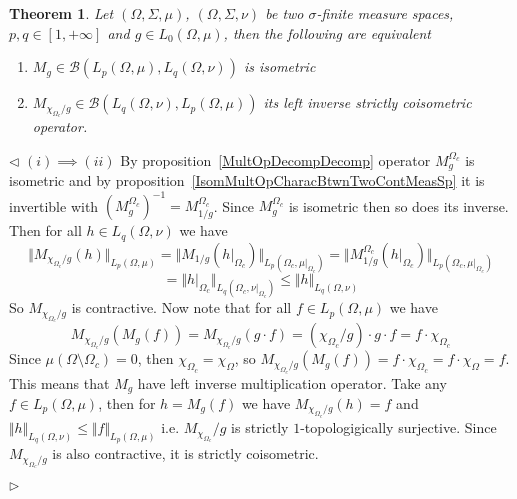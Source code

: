 \documentclass[12pt]{article}
\newtheorem{theorem}{Theorem}[subsection]
\newenvironment{proof}{\par $\triangleleft$}{$\triangleright$}
\begin{document}
\begin{theorem}\label{IsomMultOpDescBtwnTwoMeasSp}
    Let $(\Omega,\Sigma,\mu)$, $(\Omega,\Sigma,\nu)$ be two $\sigma$-finite
    measure spaces, $p,q\in[1,+\infty]$ and $g\in L_0(\Omega,\mu)$, then the
    following are equivalent
    \begin{enumerate}[label = (\roman*)]
        \item $M_g\in\mathcal{B}(L_p(\Omega,\mu),L_q(\Omega,\nu))$ is isometric

        \item $M_{\chi_{\Omega_c}/g}\in
                  \mathcal{B}(L_q(\Omega,\nu), L_p(\Omega,\mu))$ 
              its left inverse strictly coisometric operator.
    \end{enumerate}
\end{theorem}
\begin{proof}
    $(i)\implies (ii)$ By proposition~\ref{MultOpDecompDecomp} operator
    $M_g^{\Omega_c}$ is isometric and by
    proposition~\ref{IsomMultOpCharacBtwnTwoContMeasSp} it is invertible with
    ${(M_g^{\Omega_c})}^{-1}=M_{1/g}^{\Omega_c}$. Since $M_g^{\Omega_c}$ is
    isometric then so does its inverse. Then for all $h\in L_q(\Omega,\nu)$
    we have
    $$
        \Vert M_{\chi_{\Omega_c}/g}(h)\Vert_{L_p(\Omega,\mu)}= \Vert
        M_{1/g}(h|_{\Omega_c})\Vert_{L_p(\Omega_c,\mu|_{\Omega_c})}= \Vert
        M_{1/g}^{\Omega_c}(h|_{\Omega_c})\Vert_{L_p(\Omega_c,\mu|_{\Omega_c})}
    $$
    $$
        =\Vert h|_{\Omega_c}\Vert_{L_q(\Omega_c,\nu|_{\Omega_c})} \leq \Vert h
        \Vert_{L_q(\Omega,\nu)}
    $$
    So $M_{\chi_{\Omega_c}/g}$ is contractive. Now note that for
    all $f\in L_p(\Omega,\mu)$ we have
    $$
        M_{\chi_{\Omega_c}/g}(M_g(f)) =M_{\chi_{\Omega_c}/g}(g\cdot f)
        =(\chi_{\Omega_c}/g)\cdot g\cdot f =f\cdot\chi_{\Omega_c}
    $$
    Since $\mu(\Omega\setminus\Omega_c)=0$, then
    $\chi_{\Omega_c}=\chi_{\Omega}$, so
    $M_{\chi_{\Omega_c}/g}(M_g(f))=f\cdot\chi_{\Omega_c}=f\cdot\chi_{\Omega}=f$.
    This means that $M_g$ have left inverse multiplication operator. Take any
    $f\in L_p(\Omega,\mu)$, then for $h=M_g(f)$ we have
    $M_{\chi_{\Omega_c}/g}(h)=f$ and
    $\Vert h\Vert_{L_q(\Omega,\nu)}\leq\Vert f\Vert_{L_p(\Omega,\mu)}$ i.e.
    $M_{\chi_{\Omega_c}}/g$ is strictly $1$-topologigically surjective. Since
    $M_{\chi_{\Omega_c}/g}$ is also contractive, it is strictly coisometric.


\end{proof}
\end{document}
